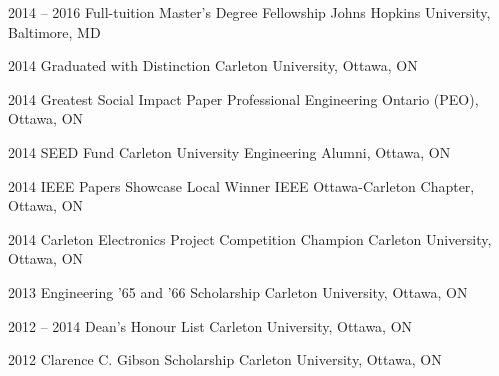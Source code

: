 \documentclass[]{friggeri-cv} %
\begin{document}
\begin{entrylist}
\vspace{-7pt}
\entry
{2014 -- 2016}
{Full-tuition Master's Degree Fellowship}
{Johns Hopkins University, Baltimore, MD}
{}
\vspace{-7pt}

\entry
{2014}
{Graduated with Distinction}
{Carleton University, Ottawa, ON}
{}
\vspace{-7pt}

\entry
{2014}
{Greatest Social Impact Paper}
{Professional Engineering Ontario (PEO), Ottawa, ON}
{}
\vspace{-7pt}

\entry
{2014}
{SEED Fund}
{Carleton University Engineering Alumni, Ottawa, ON}
{}
\vspace{-7pt}

\entry
{2014}
{IEEE Papers Showcase Local Winner}
{IEEE Ottawa-Carleton Chapter, Ottawa, ON}
{}
\vspace{-7pt}

\entry
{2014}
{Carleton Electronics Project Competition Champion}
{Carleton University, Ottawa, ON}
{}
\vspace{-7pt}

\entry
{2013}
{Engineering '65 and '66 Scholarship}
{Carleton University, Ottawa, ON}
{}
\vspace{-7pt}

\entry
{2012 -- 2014}
{Dean's Honour List}
{Carleton University, Ottawa, ON}
{}
\vspace{-7pt}

\entry
{2012}
{Clarence C. Gibson Scholarship}
{Carleton University, Ottawa, ON}
{}
\vspace{-7pt}
\end{entrylist}


\end{document}

